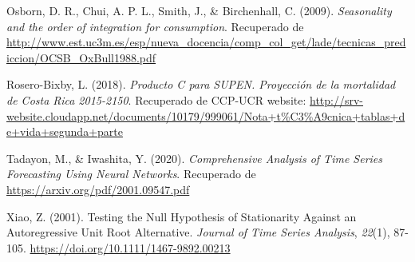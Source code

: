 \documentclass[
]{article}
\begin{document}
\leavevmode\hypertarget{ref-Osborn2009SEASONALITYAT}{}%
Osborn, D. R., Chui, A. P. L., Smith, J., \& Birchenhall, C. (2009).
\emph{Seasonality and the order of integration for consumption}.
Recuperado de
\url{http://www.est.uc3m.es/esp/nueva_docencia/comp_col_get/lade/tecnicas_prediccion/OCSB_OxBull1988.pdf}

\leavevmode\hypertarget{ref-supenprodc}{}%
Rosero-Bixby, L. (2018). \emph{Producto C para SUPEN. Proyección de la
mortalidad de Costa Rica 2015-2150}. Recuperado de CCP-UCR website:
\url{http://srv-website.cloudapp.net/documents/10179/999061/Nota+t\%C3\%A9cnica+tablas+de+vida+segunda+parte}

\leavevmode\hypertarget{ref-redes}{}%
Tadayon, M., \& Iwashita, Y. (2020). \emph{Comprehensive Analysis of
Time Series Forecasting Using Neural Networks}. Recuperado de
\url{https://arxiv.org/pdf/2001.09547.pdf}

\leavevmode\hypertarget{ref-doi:10.1111ux2f1467-9892.00213}{}%
Xiao, Z. (2001). Testing the Null Hypothesis of Stationarity Against an
Autoregressive Unit Root Alternative. \emph{Journal of Time Series
Analysis}, \emph{22}(1), 87-105.
\url{https://doi.org/10.1111/1467-9892.00213}
\end{document}
